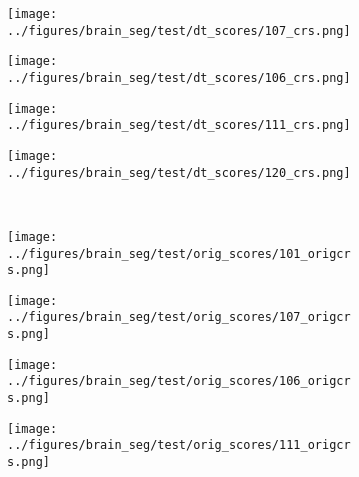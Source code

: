 \begin{figure}[h!]
\begin{subfigure}{0.16\textwidth}
		\label{fig:6}
	\end{subfigure}
	\begin{subfigure}{0.16\textwidth}
		\centering
		\texttt{[image: ../figures/brain\_seg/test/dt\_scores/107\_crs.png]}
		\label{fig:7}
	\end{subfigure}
	\begin{subfigure}{0.16\textwidth}
		\centering
		\texttt{[image: ../figures/brain\_seg/test/dt\_scores/106\_crs.png]}
		\label{fig:8}
	\end{subfigure}
	\begin{subfigure}{0.16\textwidth}
		\centering
		\texttt{[image: ../figures/brain\_seg/test/dt\_scores/111\_crs.png]}
		\label{fig:9}
	\end{subfigure}
			\begin{subfigure}{0.16\textwidth}
					\centering
					\texttt{[image: ../figures/brain\_seg/test/dt\_scores/120\_crs.png]}
					\label{fig:10}
				\end{subfigure}
		\\
	\vspace{-0.35cm}
	\begin{subfigure}[b]{0.03\textwidth} %
		\centering
	\end{subfigure}
	\hspace{0.1cm}
	\begin{subfigure}{0.16\textwidth}
		\centering
		\texttt{[image: ../figures/brain\_seg/test/orig\_scores/101\_origcrs.png]}
		\label{fig:6}
	\end{subfigure}
	\begin{subfigure}{0.16\textwidth}
		\centering
		\texttt{[image: ../figures/brain\_seg/test/orig\_scores/107\_origcrs.png]}
		\label{fig:7}
	\end{subfigure}
	\begin{subfigure}{0.16\textwidth}
		\centering
		\texttt{[image: ../figures/brain\_seg/test/orig\_scores/106\_origcrs.png]}
		\label{fig:8}
	\end{subfigure}
	\begin{subfigure}{0.16\textwidth}
		\centering
		\texttt{[image: ../figures/brain\_seg/test/orig\_scores/111\_origcrs.png]}
		\label{fig:9}
	\end{subfigure}
	\begin{subfigure}{0.16\textwidth}

\end{subfigure}
\end{figure}

